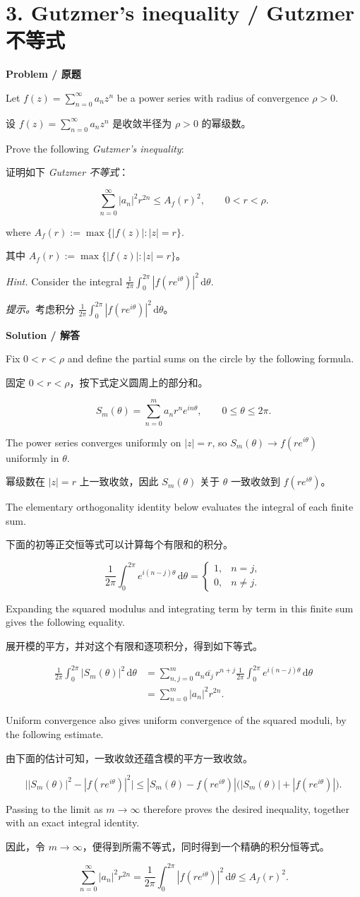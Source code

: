 \documentclass[11pt,a4paper]{ctexart}
\newcommand{\pair}[2]{\par\noindent #1\par\nopagebreak[3]\noindent #2\par}
\newcommand{\heading}[2]{\par\medskip\textbf{#1 / #2}\par\nopagebreak[4]}
\newcommand{\dd}{\,\mathrm d}
\begin{document}
\newpage
\section*{3. Gutzmer's inequality / Gutzmer 不等式}
\heading{Problem}{原题}
\pair{Let $f(z)=\sum_{n=0}^{\infty}a_nz^n$ be a power series with radius of convergence $\rho>0$.}{设 $f(z)=\sum_{n=0}^{\infty}a_nz^n$ 是收敛半径为 $\rho>0$ 的幂级数。}
\pair{Prove the following \emph{Gutzmer's inequality}:}{证明如下 \emph{Gutzmer 不等式}：}
\[
\sum_{n=0}^{\infty}|a_n|^2r^{2n}\le A_f(r)^2,
\qquad 0<r<\rho.
\]
\pair{where $A_f(r):=\max\{|f(z)|:|z|=r\}$.}{其中 $A_f(r):=\max\{|f(z)|:|z|=r\}$。}
\pair{\emph{Hint.} Consider the integral $\frac{1}{2\pi}\int_0^{2\pi}|f(re^{i\theta})|^2\dd\theta$.}{\emph{提示。}考虑积分 $\frac{1}{2\pi}\int_0^{2\pi}|f(re^{i\theta})|^2\dd\theta$。}

\heading{Solution}{解答}
\pair{Fix $0<r<\rho$ and define the partial sums on the circle by the following formula.}{固定 $0<r<\rho$，按下式定义圆周上的部分和。}
\[
S_m(\theta)=\sum_{n=0}^{m}a_nr^n e^{in\theta},\qquad 0\le\theta\le2\pi.
\]
\pair{The power series converges uniformly on $|z|=r$, so $S_m(\theta)\to f(re^{i\theta})$ uniformly in $\theta$.}{幂级数在 $|z|=r$ 上一致收敛，因此 $S_m(\theta)$ 关于 $\theta$ 一致收敛到 $f(re^{i\theta})$。}
\pair{The elementary orthogonality identity below evaluates the integral of each finite sum.}{下面的初等正交恒等式可以计算每个有限和的积分。}
\[
\frac{1}{2\pi}\int_0^{2\pi}e^{i(n-j)\theta}\dd\theta
=\begin{cases}1,&n=j,\\0,&n\ne j.\end{cases}
\]
\pair{Expanding the squared modulus and integrating term by term in this finite sum gives the following equality.}{展开模的平方，并对这个有限和逐项积分，得到如下等式。}
\begin{align*}
\frac{1}{2\pi}\int_0^{2\pi}|S_m(\theta)|^2\dd\theta
&=\sum_{n,j=0}^{m}a_n\overline{a_j}\,r^{n+j}
  \frac{1}{2\pi}\int_0^{2\pi}e^{i(n-j)\theta}\dd\theta\\
&=\sum_{n=0}^{m}|a_n|^2r^{2n}.
\end{align*}
\pair{Uniform convergence also gives uniform convergence of the squared moduli, by the following estimate.}{由下面的估计可知，一致收敛还蕴含模的平方一致收敛。}
\[
\bigl||S_m(\theta)|^2-|f(re^{i\theta})|^2\bigr|
\le |S_m(\theta)-f(re^{i\theta})|
       \bigl(|S_m(\theta)|+|f(re^{i\theta})|\bigr).
\]
\pair{Passing to the limit as $m\to\infty$ therefore proves the desired inequality, together with an exact integral identity.}{因此，令 $m\to\infty$，便得到所需不等式，同时得到一个精确的积分恒等式。}
\[
\boxed{\sum_{n=0}^{\infty}|a_n|^2r^{2n}
=\frac{1}{2\pi}\int_0^{2\pi}|f(re^{i\theta})|^2\dd\theta
\le A_f(r)^2.}
\]
\end{document}
